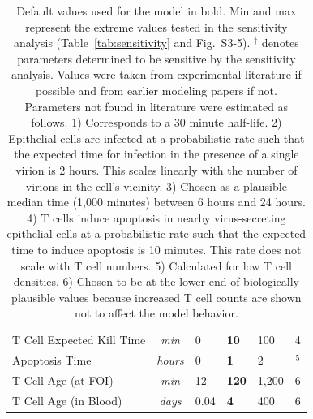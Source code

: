 \documentclass[10pt]{article}
\begin{document}
\begin{table}[!ht]
\begin{center}
\begin{tabular}{| l | c | l l l | c |}
  T Cell Expected Kill Time & \textit{min} & 0 & \textbf{10} & 100 & 4 \\
  Apoptosis Time & \textit{hours} & 0 & \textbf{1} & 2 & \cite{Ganusov2008}$^5$ \\
  T Cell Age (at FOI) & \textit{min} & 12 & \textbf{120} & 1,200 & 6 \\
  T Cell Age (in Blood) & \textit{days} & 0.04 & \textbf{4} & 400 & 6 \\
  \hline  
\end{tabular}
\caption{Default values used for the model in bold.  Min and max represent the extreme values tested in the sensitivity analysis (Table~\ref{tab:sensitivity} and Fig.~S3-5).  $^{\dagger}$ denotes parameters determined to be sensitive by the sensitivity analysis.  Values were taken from experimental literature if possible and from earlier modeling papers if not.  Parameters not found in literature were estimated as follows.  1) Corresponds to a 30 minute half-life.  2) Epithelial cells are infected at a probabilistic rate such that the expected time for infection in the presence of a single virion is 2 hours.  This scales linearly with the number of virions in the cell's vicinity.  3) Chosen as a plausible median time (1,000 minutes) between 6 hours and 24 hours.  4) T cells induce apoptosis in nearby virus-secreting epithelial cells at a probabilistic rate such that the expected time to induce apoptosis is 10 minutes.  This rate does not scale with T cell numbers.  5) Calculated for low T cell densities.  6) Chosen to be at the lower end of biologically plausible values because increased T cell counts are shown not to affect the model behavior. }
\label{tab:parameters}
\end{center}
\end{table}
\end{document}
